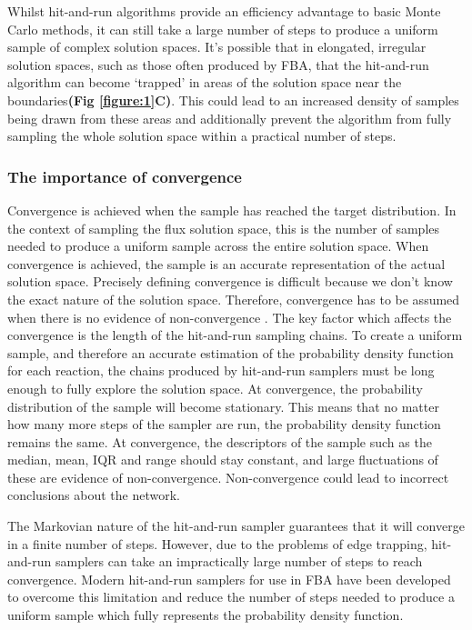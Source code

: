 \documentclass[10pt,letterpaper]{article}
\begin{document}
Whilst hit-and-run algorithms provide an efficiency advantage to basic Monte Carlo methods, it can still take a large number of steps to produce a uniform sample of complex solution spaces. It’s possible that in elongated, irregular solution spaces, such as those often produced by FBA, that the hit-and-run algorithm can become ‘trapped’ in areas of the solution space near the boundaries\cite{Megchelenbrink}\cite{Hogg}\textbf{(Fig \ref{figure:1}C)}. This could lead to an increased density of samples being drawn from these areas and additionally prevent the algorithm from fully sampling the whole solution space within a practical number of steps\cite{Hogg}.

\subsubsection*{The importance of convergence}
Convergence is achieved when the sample has reached the target distribution. In the context of sampling the flux solution space, this is the number of samples needed to produce a uniform sample across the entire solution space. When convergence is achieved, the sample is an accurate representation of the actual solution space\cite{Hamra}. Precisely defining convergence is difficult because we don’t know the exact nature of the solution space. Therefore, convergence has to be assumed when there is no evidence of non-convergence \cite{Hamra}. The key factor which affects the convergence is the length of the hit-and-run sampling chains. To create a uniform sample, and therefore an accurate estimation of the probability density function for each reaction, the chains produced by hit-and-run samplers must be long enough to fully explore the solution space. At convergence, the probability distribution of the sample will become stationary. This means that no matter how many more steps of the sampler are run, the probability density function remains the same\cite{Hamra}. At convergence, the descriptors of the sample such as the median, mean, IQR and range should stay constant, and large fluctuations of these are evidence of non-convergence. Non-convergence could lead to incorrect conclusions about the network.

The Markovian nature of the hit-and-run sampler guarantees that it will converge in a finite number of steps\cite{Ravenzwaaij}. However, due to the problems of edge trapping, hit-and-run samplers can take an impractically large number of steps to reach convergence\cite{Megchelenbrink}. Modern hit-and-run samplers for use in FBA have been developed to overcome this limitation and reduce the number of steps needed to produce a uniform sample which fully represents the probability density function.
\end{document}
